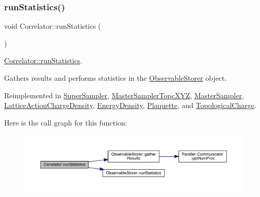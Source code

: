 \subsubsection{\texorpdfstring{runStatistics()}{runStatistics()}}
{\footnotesize\ttfamily void Correlator\+::run\+Statistics (\begin{DoxyParamCaption}{ }\end{DoxyParamCaption})\hspace{0.3cm}{\ttfamily [virtual]}}



\mbox{\hyperlink{class_correlator_a35197b1d12b62ef30b79c0138a26456e}{Correlator\+::run\+Statistics}}. 

Gathers results and performs statistics in the \mbox{\hyperlink{class_observable_storer}{Observable\+Storer}} object. 

Reimplemented in \mbox{\hyperlink{class_super_sampler_af96f7d461e9159adb4eef9bda9c6ecde}{Super\+Sampler}}, \mbox{\hyperlink{class_master_sampler_topc_x_y_z_af748653ded9908f78383185475b9ddeb}{Master\+Sampler\+Topc\+X\+YZ}}, \mbox{\hyperlink{class_master_sampler_ab7913d0dbdea57af3f469a3cdd74f8fc}{Master\+Sampler}}, \mbox{\hyperlink{class_lattice_action_charge_density_a21d608703811d2814e7f654588eaa0c0}{Lattice\+Action\+Charge\+Density}}, \mbox{\hyperlink{class_energy_density_a584e164453ce880a45478c9b48ce2c4b}{Energy\+Density}}, \mbox{\hyperlink{class_plaquette_aa54bf1807d9b192048026f94d585fa4f}{Plaquette}}, and \mbox{\hyperlink{class_topological_charge_ab9afadb9f37e638c0a168ebab5d41353}{Topological\+Charge}}.

Here is the call graph for this function\+:\nopagebreak
\begin{figure}[H]
\begin{center}
\leavevmode
\includegraphics[width=350pt]{class_correlator_a35197b1d12b62ef30b79c0138a26456e_cgraph}
\end{center}
\end{figure}
\mbox{\label{class_correlator_a168512b2ce182d9478db47f100125fa6}} 

